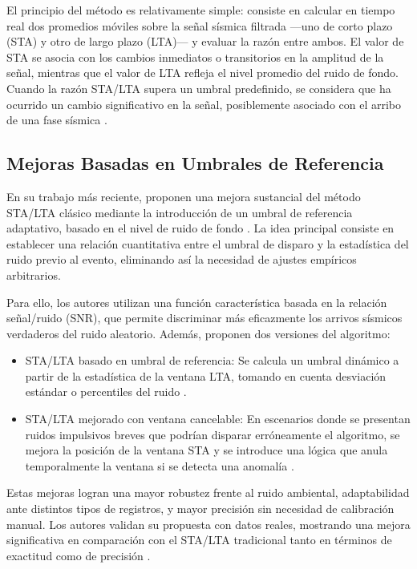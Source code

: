El principio del método es relativamente simple: consiste en calcular en tiempo real dos promedios móviles sobre la señal sísmica filtrada —uno de corto plazo (STA) y otro de largo plazo (LTA)— y evaluar la razón entre ambos. El valor de STA se asocia con los cambios inmediatos o transitorios en la amplitud de la señal, mientras que el valor de LTA refleja el nivel promedio del ruido de fondo. Cuando la razón STA/LTA supera un umbral predefinido, se considera que ha ocurrido un cambio significativo en la señal, posiblemente asociado con el arribo de una fase sísmica \cite{allen1978automatic}.

\subsection{Mejoras Basadas en Umbrales de Referencia}

En su trabajo más reciente, \cite{qiu2023sta} proponen una mejora sustancial del método STA/LTA clásico mediante la introducción de un umbral de referencia adaptativo, basado en el nivel de ruido de fondo \cite{qiu2023sta}. La idea principal consiste en establecer una relación cuantitativa entre el umbral de disparo y la estadística del ruido previo al evento, eliminando así la necesidad de ajustes empíricos arbitrarios.

Para ello, los autores utilizan una función característica basada en la relación señal/ruido (SNR), que permite discriminar más eficazmente los arrivos sísmicos verdaderos del ruido aleatorio. Además, proponen dos versiones del algoritmo:

\begin{itemize}
    \item STA/LTA basado en umbral de referencia: Se calcula un umbral dinámico a partir de la estadística de la ventana LTA, tomando en cuenta desviación estándar o percentiles del ruido \cite{qiu2023sta}.
    \item STA/LTA mejorado con ventana cancelable: En escenarios donde se presentan ruidos impulsivos breves que podrían disparar erróneamente el algoritmo, se mejora la posición de la ventana STA y se introduce una lógica que anula temporalmente la ventana si se detecta una anomalía \cite{qiu2023sta}.
\end{itemize}

Estas mejoras logran una mayor robustez frente al ruido ambiental, adaptabilidad ante distintos tipos de registros, y mayor precisión sin necesidad de calibración manual. Los autores validan su propuesta con datos reales, mostrando una mejora significativa en comparación con el STA/LTA tradicional tanto en términos de exactitud como de precisión \cite{qiu2023sta}.

